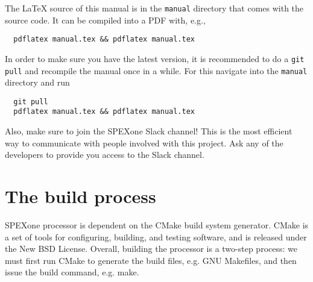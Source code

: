 \documentclass{article}
\begin{document}
The LaTeX source of this  manual is in the \lstinline!manual! directory that comes with the source code. It can be compiled into a PDF with, e.g.,
\begin{lstlisting}
  pdflatex manual.tex && pdflatex manual.tex
\end{lstlisting}
In order to make sure you have the latest version, it is recommended to do a \lstinline!git pull! and recompile the manual once in a while. For this navigate into the \lstinline!manual! directory and run
\begin{lstlisting}
  git pull
  pdflatex manual.tex && pdflatex manual.tex
\end{lstlisting}

Also, make sure to join the SPEXone Slack channel! This is the most efficient way to communicate with people involved with this project. Ask any of the developers to provide you access to the Slack channel.

\section{The build process}

SPEXone processor is dependent on the CMake build system generator. CMake is a set of tools for configuring, building, and testing software, and is released under the New BSD License. Overall, building the processor is a two-step process: we must first run CMake to generate the build files, e.g. GNU Makefiles, and then issue the build command, e.g. make.
\end{document}
